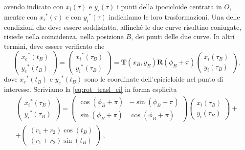 \noindent avendo indicato con ${x_i}\left(\tau\right)$ e ${y_i}\left(\tau\right)$
 i punti della ipocicloide centrata in $O$, mentre con
${x_i}^*\left(\tau\right)$ e con ${y_i}^*\left(\tau\right)$
indichiamo le loro trasformazioni.
Una delle condizioni che deve essere soddisfatta,
affinch\'e le due curve risultino coniugate, risiede 
nella coincidenza, nella posizione $B$, dei punti delle due curve.
In altri termini, deve essere verificato che
\begin{equation}
\begin{pmatrix} {x_e}^*\left(t_{\scriptscriptstyle B}\right)\\{y_e}^*\left(t_{\scriptscriptstyle B}\right) \end{pmatrix}=
\begin{pmatrix} {x_i}^*\left(\tau_{\scriptscriptstyle B}\right)\\{y_i}^*\left(\tau_{\scriptscriptstyle B}\right)
\end{pmatrix}
={\bm T}(x_{\scriptscriptstyle B}, y_{\scriptscriptstyle B}){\bm R}(\phi_{\scriptscriptstyle B} +\pi)
\begin{pmatrix} {x_i}\left(\tau_{\scriptscriptstyle B}\right)\\{y_i}\left(\tau_{\scriptscriptstyle B}\right)
\end{pmatrix}\,,
 \label{eq:rot_trasl_ei}
\end{equation}
\noindent dove ${x_e}^*\left(t_{\scriptscriptstyle B}\right)$ e
${y_e}^*\left(t_{\scriptscriptstyle B}\right)$ sono le coordinate 
dell'epicicloide nel punto di interesse.
\noindent Scriviamo la
\ref{eq:rot_trasl_ei} in forma esplicita
\begin{multline}
\begin{pmatrix} {x_i}^*\left(\tau_{\scriptscriptstyle B}\right)\\{y_i}^*\left(\tau_{\scriptscriptstyle B}\right) \end{pmatrix} =
\begin{pmatrix} \cos(\phi_{\scriptscriptstyle B}+\pi) &-\sin(\phi_{\scriptscriptstyle B}+\pi)\\
		 \sin(\phi_{\scriptscriptstyle B}+\pi) &\cos(\phi_{\scriptscriptstyle B}+\pi) \end{pmatrix}
\begin{pmatrix} {x_i}\left(\tau_{\scriptscriptstyle B}\right)\\{y_i}\left(\tau_{\scriptscriptstyle B}\right) \end{pmatrix} + \\
+ \begin{pmatrix} (r_1+r_2)\cos(t_{\scriptscriptstyle B})\\(r_1+r_2)\sin(t_{\scriptscriptstyle B}) \end{pmatrix}\,,
\label{eq:ipocicloide_ruototraslata}
\end{multline}
